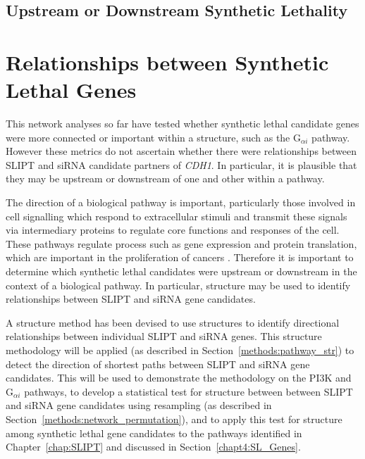 \FloatBarrier

\subsection{Upstream or Downstream Synthetic Lethality}
\fi

\FloatBarrier

\section{Relationships between Synthetic Lethal Genes}

This network analyses so far have tested whether \gls{synthetic lethal} candidate genes were more connected or important within a  structure, such as the G$_{\alpha i}$ \gls{pathway}. However these metrics do not ascertain whether there were relationships between \gls{SLIPT} and \gls{siRNA} candidate partners of \textit{CDH1}. In particular, it is plausible that they may be upstream or downstream of one and other within a \gls{pathway}.

The direction of a biological \gls{pathway} is important, particularly those involved in cell signalling which respond to extracellular stimuli and transmit these signals via intermediary proteins to regulate core functions and responses of the cell. These \glspl{pathway} regulate process such as \gls{gene expression} and protein translation, which are important in the proliferation of cancers \citep{Gao2015}. Therefore it is important to determine which \gls{synthetic lethal} candidates were upstream or downstream in the context of a biological \gls{pathway}. In particular,  structure may be used to identify relationships between \gls{SLIPT} and \gls{siRNA} gene candidates.

A  structure method has been devised to use  structures to identify directional relationships between individual \gls{SLIPT} and \gls{siRNA} genes. This  structure methodology will be applied (as described in Section~\ref{methods:pathway_str}) to detect the direction of \glspl{shortest path} between \gls{SLIPT} and \gls{siRNA} gene candidates. This will be used to demonstrate the methodology on the \gls{PI3K} and G$_{\alpha i}$ \glspl{pathway}, to develop a statistical test for  structure between between \gls{SLIPT} and \gls{siRNA} gene candidates using resampling  (as described in Section~\ref{methods:network_permutation}), and to apply this test for  structure among \gls{synthetic lethal} gene candidates to the \glspl{pathway} identified in Chapter~\ref{chap:SLIPT} and discussed in Section~\ref{chapt4:SL_Genes}.

